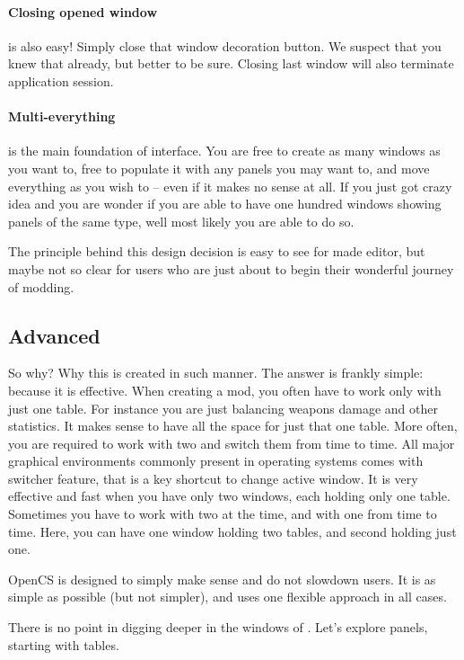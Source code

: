\paragraph{Closing opened window}
is also easy! Simply close that window decoration button. We suspect that you knew that already, but better to be sure. 
Closing last \OCS{} window will also terminate application session.

\paragraph{Multi-everything}
is the main foundation of \OCS{} interface. You are free to create as many windows as you want to, free to populate it with 
any panels you may want to, and move everything as you wish to -- even if it makes no sense at all. If you just got crazy idea and
you are wonder if you are able to have one hundred \OCS{} windows showing panels of the same type, well most likely you are
able to do so.

The principle behind this design decision is easy to see for \BS{} made editor, but maybe not so clear for users who are
just about to begin their wonderful journey of modding.

\subsection{Advanced}
So why? Why this is created in such manner. The answer is frankly simple: because it is effective. When creating a mod, you often
have to work only with just one table. For instance you are just balancing weapons damage and other statistics. It makes sense
to have all the space for just that one table. More often, you are required to work with two and switch them from time to time.
All major graphical environments commonly present in operating systems comes with switcher feature, that is a key shortcut to change
active window. It is very effective and fast when you have only two windows, each holding only one table. Sometimes you have to work
with two at the time, and with one from time to time. Here, you can have one window holding two tables, and second holding just one.

OpenCS is designed to simply make sense and do not slowdown users. It is as simple as possible (but not simpler), and uses one
flexible approach in all cases.

There is no point in digging deeper in the windows of \OCS. Let's explore panels, starting with tables.

